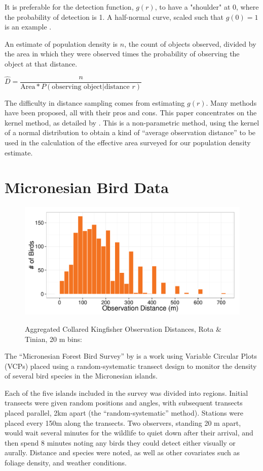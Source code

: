 \documentclass[12pt]{article}
\begin{document}
It is preferable for the detection function, $g(r)$, to have a "shoulder" at 0, where the probability of detection is 1. A half-normal curve, scaled such that $g(0)=1$ is an example \parencite{buckland2001}.

An estimate of population density is $n$, the count of objects observed, divided by the area in which they were observed times the probability of observing the object at that distance. \cite{buckland2001} %

$\hat{D}=\dfrac{n}{\mbox{Area}*P(\mbox{observing object}|\mbox{distance }r)}$

The difficulty in distance sampling comes from estimating $g(r)$. Many methods have been proposed, all with their pros and cons. This paper concentrates on the kernel method, as detailed by \textcite{quang1993}. This is a non-parametric method, using the kernel of a normal distribution to obtain a kind of ``average observation distance'' to be used in the calculation of the effective area surveyed for our population density estimate.

\section{Micronesian Bird Data}
\begin{figure}
	\caption{Aggregated Collared Kingfisher Observation Distances, Rota \& Tinian, 20 m bins: \cite{micronesian}}
	\includegraphics[width=\textwidth]{../images/histogram_dist_20m.pdf}
	\label{fig:82dist}
\end{figure}
The ``Micronesian Forest Bird Survey'' by \textcite{micronesian} is a work using Variable Circular Plots (VCPs) placed using a random-systematic transect design to monitor the density of several bird species in the Micronesian islands.

Each of the five islands included in the survey was divided into regions. Initial transects were given random positions and angles, with subsequent transects placed parallel, 2km apart (the ``random-systematic'' method). Stations were placed every 150m along the transects. Two observers, standing 20 m apart, would wait several minutes for the wildlife to quiet down after their arrival, and then spend 8 minutes noting any birds they could detect either visually or aurally. Distance and species were noted, as well as other covariates such as foliage density, and weather conditions. 
\end{document}

